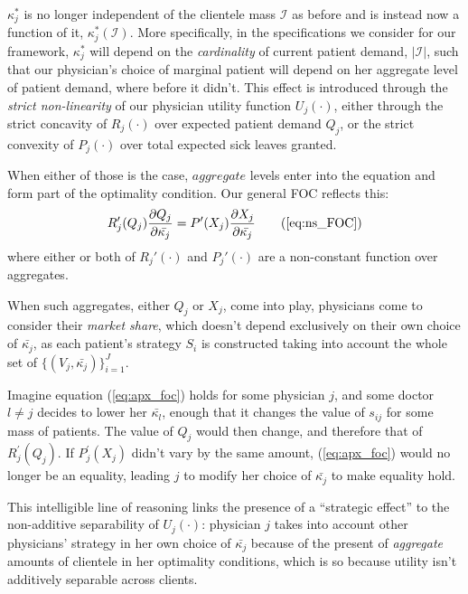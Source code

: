 \documentclass[../main.tex]{subfiles}
\begin{document}
$\kappa_j^*$ is no longer independent of the clientele mass $\mathcal{I}$ as before and is instead now a function of it, $\kappa_j^*(\mathcal{I})$. More specifically, in the specifications we consider for our framework, $\kappa_j^*$ will depend on the \textit{cardinality} of current patient demand, $|\mathcal{I}|$, such that our physician's choice of marginal patient will depend on her aggregate level of patient demand, where before it didn't. This effect is introduced through the \textit{strict non-linearity} of our physician utility function $U_j(\cdot)$, either through the strict concavity of $R_j(\cdot)$ over expected patient demand $Q_j$, or the strict convexity of $P_j(\cdot)$ over total expected sick leaves granted.

When either of those is the case, $aggregate$ levels enter into the equation and form part of the optimality condition. Our general FOC reflects this:
\begin{equation}
 R_j^{\prime}(Q_j)\frac{\partial Q_j}{\partial\bar{\kappa_j}} = P^{\prime}(X_j)\frac{\partial X_j}{\partial \bar{\kappa_j}} \tag{\ref{eq:ns_FOC}}
 \label{eq:apx_foc}
\end{equation}
where either or both of $R_j'(\cdot)$ and $P_j'(\cdot)$ are a non-constant function over aggregates.

When such aggregates, either $Q_j$ or $X_j$, come into play, physicians come to consider their \textit{market share}, which doesn't depend exclusively on their own choice of $\bar{\kappa_j}$, as each patient's strategy $S_i$ is constructed taking into account the whole  set of $\{(V_j,\bar{\kappa_j})\}_{i =1}^{J}$.

Imagine equation (\ref{eq:apx_foc}) holds for some physician $j$, and some doctor $l \neq j$ decides to lower her $\bar{\kappa_l}$, enough that it changes the value of $s_{ij}$ for some mass of patients. The value of $Q_j$ would then change, and therefore that of $ R_j^{\prime}(Q_j)$. If $P_j^{\prime}(X_j)$ didn't vary by the same amount, (\ref{eq:apx_foc}) would no longer be an equality, leading $j$ to modify her choice of $\bar{\kappa_j}$ to make equality hold.

This intelligible line of reasoning links the presence of a ``strategic effect'' to the non-additive separability of $U_j(\cdot)$: physician $j$ takes into account other physicians' strategy in her own choice of $ \bar{\kappa_j}$ because of the present of \textit{aggregate} amounts of clientele in her optimality conditions, which is so because utility isn't additively separable across clients.
\end{document}
